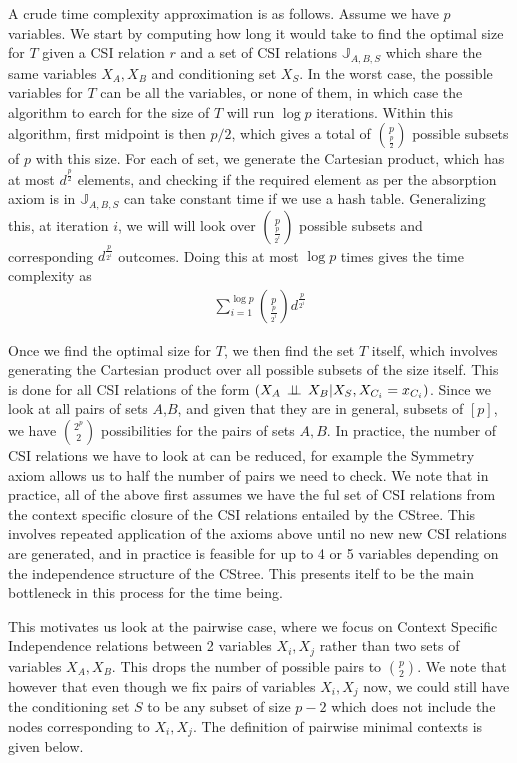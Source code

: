 \documentclass{tufte-book}
\begin{document}
A crude time complexity approximation is as follows. Assume we have \(p\) variables. We start by computing how long it would take to find the optimal size for \(T\) given a CSI relation \(r\) and a set of CSI relations \(\mathbb{J}_{A,B,S}\) which share the same variables \(X_A,X_B\) and conditioning set \(X_S\). In the worst case, the possible variables for \(T\) can be all the variables, or none of them, in which case the algorithm to earch for the size of \(T\) will run \(\log p\) iterations. Within this algorithm, first midpoint is then \(p/2\), which gives a total of \(p\choose \frac{p}{2}\) possible subsets of \(p\) with this size. For each of set, we generate the Cartesian product, which has at most \(d^{\frac{p}{2}}\) elements, and checking if the required element as per the absorption axiom is in \(\mathbb{J}_{A,B,S}\) can take constant time if we use a hash table. Generalizing this, at iteration \(i\), we will will look over \(p \choose \frac{p}{2^i}\) possible subsets and corresponding \(d^{\frac{p}{2^i}}\) outcomes. Doing this at most \(\log p\) times gives the time complexity as
\begin{align*}
\sum_{i=1}^{\log p} {p\choose{\frac{p}{2^i}}}d^{\frac{p}{2^i}}
\end{align*}

Once we find the optimal size for \(T\), we then find the set \(T\) itself, which involves generating the Cartesian product over all possible subsets of the size itself. This is done for all CSI relations of the form \((X_A\,\perp \!\!\! \perp\,X_B|X_S,X_{C_i}=x_{C_i})\). Since we look at all pairs of sets \(A\),\(B\), and given that they are in general, subsets of \([p]\), we have \(2^p \choose 2\) possibilities for the pairs of sets \(A,B\). In practice, the number of CSI relations we have to look at can be reduced, for example the Symmetry axiom allows us to half the number of pairs we need to check. We note that in practice, all of the above first assumes we have the ful set of CSI relations from the context specific closure of the CSI relations entailed by the CStree. This involves repeated application of the axioms above until no new new CSI relations are generated, and in practice is feasible for up to 4 or 5 variables depending on the independence structure of the CStree. This presents itelf to be the main bottleneck in this process for the time being.


This motivates us look at the pairwise case, where we focus on Context Specific Independence relations between 2 variables \(X_i,X_j\) rather than two sets of variables \(X_A,X_B\). This drops the number of possible pairs to \(p \choose 2\). We note that however that even though we fix pairs of variables \(X_i,X_j\) now, we could still have the conditioning set \(S\) to be any subset of size \(p-2\) which does not include the nodes corresponding to \(X_i,X_j\). The definition of pairwise minimal contexts is given below.
\end{document}
